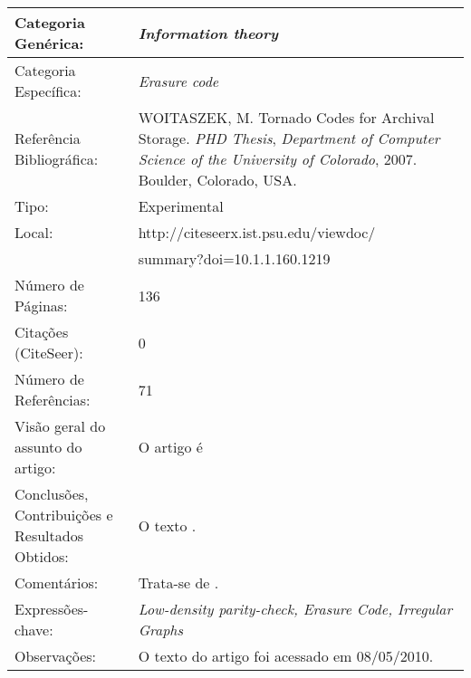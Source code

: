 \documentclass[10pt,a4paper]{article}
\begin{document}
\begin{center}
\begin{tabular}{|p{5cm}||p{10cm}|}
\hline

Categoria Genérica: & \emph{Information theory}\\\hline
Categoria Específica: & \emph{Erasure code}\\\hline
Referência Bibliográfica: & WOITASZEK, M. Tornado Codes for Archival Storage.  \emph{PHD Thesis}, \emph{Department of Computer Science of the University of Colorado}, 2007. Boulder, Colorado, USA. \\\hline
Tipo: & Experimental\\\hline
Local: & http://citeseerx.ist.psu.edu/viewdoc/\\ &summary?doi=10.1.1.160.1219\\\hline
Número de Páginas: & 136\\\hline
Citações (CiteSeer): & 0\\\hline
Número de Referências: & 71\\\hline
Visão geral do assunto do artigo: & O artigo é  \\\hline
Conclusões, Contribuições e Resultados Obtidos: &  O texto . \\\hline
Comentários: & Trata-se de . \\\hline
Expressões-chave: & \emph{Low-density parity-check, Erasure Code, Irregular Graphs}\\\hline
Observações: &  O texto do artigo foi acessado em 08/05/2010.\\\hline

\end{tabular}
\end{center}
\end{document}
